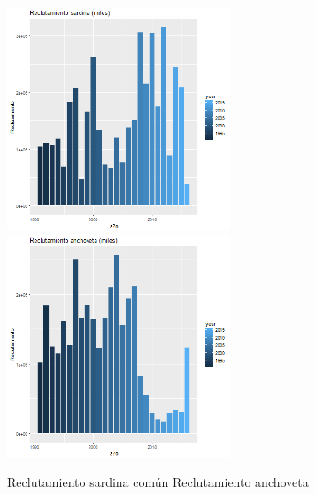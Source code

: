 \documentclass[]{article}
\begin{document}
\includegraphics[width=0.50000\textwidth]{Figuras/1.png}
\includegraphics[width=0.50000\textwidth]{Figuras/2.png}

\newpage

Reclutamiento sardina común  \newpage
Reclutamiento anchoveta 
\end{document}
